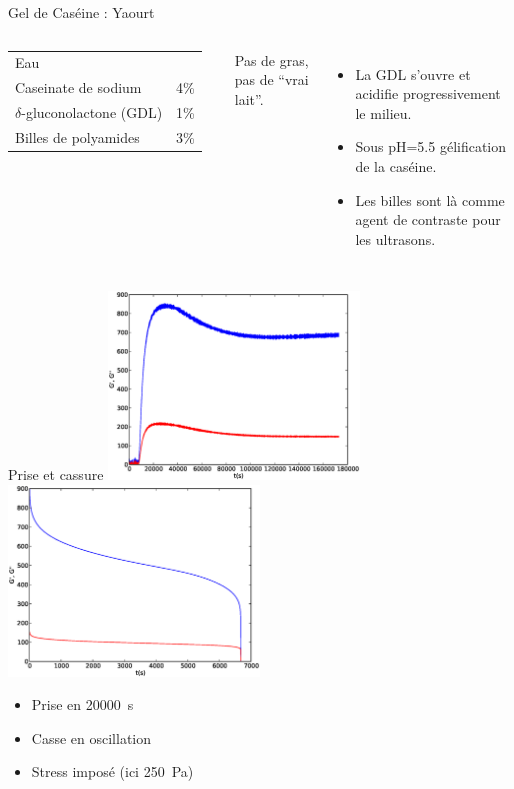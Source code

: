 \documentclass{beamer}
\begin{document}
\begin{frame}
\begin{center}
\end{center}
\end{frame}

\begin{frame}{Gel de Caséine : \og Yaourt \fg{}}
\begin{columns}
\begin{tabular}{@{}ll@{}}\toprule
Eau &  \\ 
Caseinate de sodium & 4\% \\ 
$\delta$-gluconolactone (GDL) & 1\% \\ 
Billes de polyamides & 3\% \\ 
\bottomrule
\end{tabular}

\bigskip

Pas de gras, pas de ``vrai lait''.
\begin{itemize}
\item La GDL s'ouvre et acidifie progressivement le milieu.
\item Sous pH=5.5 gélification de la caséine.
\item Les billes sont là comme agent de contraste pour les ultrasons.
\end{itemize}
\end{columns}
\end{frame}
\tikzset{external/force remake=true}
\begin{frame}{Prise et cassure}
\includegraphics[width=0.5\textwidth]{Y22_prise.eps}%
\includegraphics[width=0.5\textwidth]{Y22_rupture.eps}

\begin{itemize}
	\item Prise en \SI{20000}{\second}
	\item Casse en oscillation
	\item Stress imposé (ici \SI{250}{\pascal})
\end{itemize}
\end{frame}
\tikzset{external/force remake=false}
\end{document}
